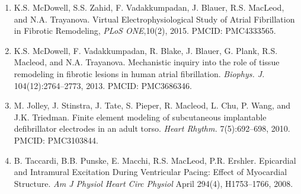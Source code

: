 \documentclass[10pt]{article}
\begin{document}
\begin{description}
    \begin{enumerate}
      \item K.S. McDowell, S.S. Zahid, F. Vadakkumpadan, J.  Blauer,
        R.S. MacLeod, and N.A. Trayanova.  Virtual Electrophysiological
        Study of Atrial Fibrillation in Fibrotic Remodeling, \emph{PLoS
          ONE},10(2), 2015.  PMCID: PMC4333565.
      \item K.S. McDowell, F. Vadakkumpadan, R. Blake, J.  Blauer,
        G. Plank, R.S. Macleod, and N.A. Trayanova.  Mechanistic inquiry
        into the role of tissue remodeling in fibrotic lesions in human
        atrial fibrillation. \emph{Biophys. J.} 104(12):2764--2773, 2013.
        PMCID: PMC3686346. 
      \item M. Jolley, J. Stinstra, J. Tate, S. Pieper, R. Macleod, L. Chu,
        P. Wang, and J.K. Triedman.  Finite element modeling of
        subcutaneous implantable defibrillator electrodes in an adult
        torso.  \emph{Heart Rhythm.} 7(5):692--698, 2010. PMCID:
        PMC3103844.
      \item B. Taccardi, B.B. Punske, E. Macchi, R.S. MacLeod,
        P.R. Ershler.  Epicardial and Intramural Excitation During
        Ventricular Pacing: Effect of Myocardial Structure. \emph{Am J
          Physiol Heart Circ Physiol} April 294(4), H1753--1766, 2008.
    \end{enumerate}


\end{description}
\end{document}
